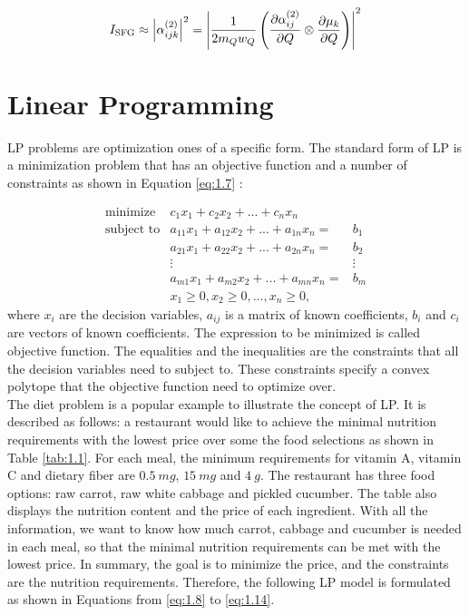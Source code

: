 \begin{equation} \label{eq:1.6}
I_{\rm SFG} \approx \left| \alpha^{(2)}_{ijk} \right|^{2}
= \left| \frac{1}{2m_{Q}w_{Q}} \left( \frac{\partial\alpha^{(2)}_{ij}}{\partial Q} \otimes \frac{\partial\mu_{k}}{\partial Q} \right) \right|^{2}
\end{equation}

\section{Linear Programming}
LP problems are optimization ones of a specific form. The standard form of LP is a minimization problem that has an objective function and a number of constraints as shown in Equation \ref{eq:1.7} \cite{UULP}:

\begin{eqnarray}  \label{eq:1.7}
 \text{minimize} & c_{1}x_{1} + c_{2}x_{2} + ... + c_{n} x_{n}  \nonumber \\
 \text{subject to} & a_{11} x_{1} + a_{12} x_{2}+ ... + a_{1n} x_{n} = & b_{1} \nonumber \\
& a_{21} x_{1} + a_{22} x_{2} + ... + a_{2n} x_{n} = & b_{2} \nonumber \\
&\vdots                                   &\vdots \nonumber \\
& a_{m1} x_{1} + a_{m2} x_{2} + ... + a_{mn} x_{n} = & b_{m} \nonumber \\
& x_{1} \geq 0, x_{2} \geq 0, ... ,x_{n} \geq 0, 
\end{eqnarray} 
where $x_{i}$ are the decision variables, $a_{ij}$ is a matrix of known coefficients, $b_{i}$ and $c_{i}$ are vectors of known coefficients. The expression to be minimized is called objective function. The equalities and the inequalities are the constraints that all the decision variables need to subject to. These constraints specify a convex polytope that the objective function need to optimize over. \\ 

The diet problem is a popular example to illustrate the concept of LP. It is described as follows: a restaurant would like to achieve the minimal nutrition requirements with the lowest price over some the food selections as shown in Table \ref{tab:1.1}. For each meal, the minimum requirements for vitamin A, vitamin C and dietary fiber are $0.5~mg$, $15~mg$ and $4~g$. The restaurant has three food options: raw carrot, raw white cabbage and pickled cucumber. The table also displays the nutrition content and the price of each ingredient. With all the information, we want to know how much carrot, cabbage and cucumber is needed in each meal, so that the minimal nutrition requirements can be met with the lowest price. In summary, the goal is to minimize the price, and the constraints are the nutrition requirements. Therefore, the following LP model is formulated as shown in Equations from \ref{eq:1.8} to \ref{eq:1.14}.

